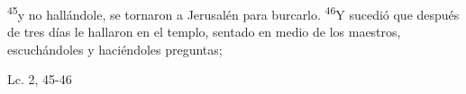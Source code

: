 \documentclass[../../rosario.tex]{subfiles}
\begin{document}
    \textsuperscript{45}y no hallándole, se tornaron a Jerusalén para burcarlo. \textsuperscript{46}Y sucedió que después de tres días le hallaron en el templo,
    sentado en medio de los maestros, escuchándoles y haciéndoles preguntas;
    \begin{flushright}
    Lc. 2, 45-46       
    \end{flushright}
\end{document}
